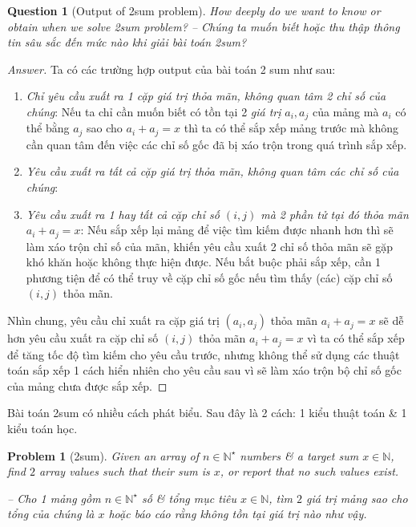 \documentclass{article}
\newtheorem{problem}{Problem}
\newtheorem{question}{Question}
\begin{document}
\begin{question}[Output of {\sc2sum} problem]
    How deeply do we want to know or obtain when we solve {\sc2sum} problem? -- Chúng ta muốn biết hoặc thu thập thông tin sâu sắc đến mức nào khi giải bài toán {\sc2sum}?
\end{question}

\begin{proof}[Answer]
    Ta có các trường hợp output của bài toán 2 sum như sau:
    \begin{enumerate}
        \item {\it Chỉ yêu cầu xuất ra 1 cặp giá trị thỏa mãn, không quan tâm 2 chỉ số của chúng}: Nếu ta chỉ cần muốn biết có tồn tại 2 {\it giá trị} $a_i,a_j$ của mảng mà $a_i$ có thể bằng $a_j$ sao cho $a_i + a_j = x$ thì ta có thể sắp xếp mảng trước mà không cần quan tâm đến việc các chỉ số gốc đã bị xáo trộn trong quá trình sắp xếp.
        \item {\it Yêu cầu xuất ra tất cả cặp giá trị thỏa mãn, không quan tâm các chỉ số của chúng}:
        \item {\it Yêu cầu xuất ra 1 hay tất cả cặp chỉ số $(i,j)$ mà 2 phần tử tại đó thỏa mãn $a_i + a_j = x$}: Nếu sắp xếp lại mảng để việc tìm kiếm được nhanh hơn thì sẽ làm xáo trộn chỉ số của mãn, khiến yêu cầu xuất 2 chỉ số thỏa mãn sẽ gặp khó khăn hoặc không thực hiện được. Nếu bắt buộc phải sắp xếp, cần 1 phương tiện để có thể truy về cặp chỉ số gốc nếu tìm thấy (các) cặp chỉ số $(i,j)$ thỏa mãn.
    \end{enumerate}
    Nhìn chung, yêu cầu chỉ xuất ra cặp giá trị $(a_i,a_j)$ thỏa mãn $a_i + a_j = x$ sẽ dễ hơn yêu cầu xuất ra cặp chỉ số $(i,j)$ thỏa mãn $a_i + a_j = x$ vì ta có thể sắp xếp để tăng tốc độ tìm kiếm cho yêu cầu trước, nhưng không thể sử dụng các thuật toán sắp xếp 1 cách hiển nhiên cho yêu cầu sau vì sẽ làm xáo trộn bộ chỉ số gốc của mảng chưa được sắp xếp.
\end{proof}
Bài toán {\sc2sum} có nhiều cách phát biểu. Sau đây là 2 cách: 1 kiểu thuật toán \& 1 kiểu toán học.

\begin{problem}[{\sc2sum}]
    Given an array of $n\in\mathbb{N}^\star$ numbers \& a target sum $x\in\mathbb{N}$, find $2$ array values such that their sum is $x$, or report that no such values exist.

    -- Cho 1 mảng gồm $n\in\mathbb{N}^\star$ số \& tổng mục tiêu $x\in\mathbb{N}$, tìm $2$ giá trị mảng sao cho tổng của chúng là $x$ hoặc báo cáo rằng không tồn tại giá trị nào như vậy.
\end{problem}
\end{document}
